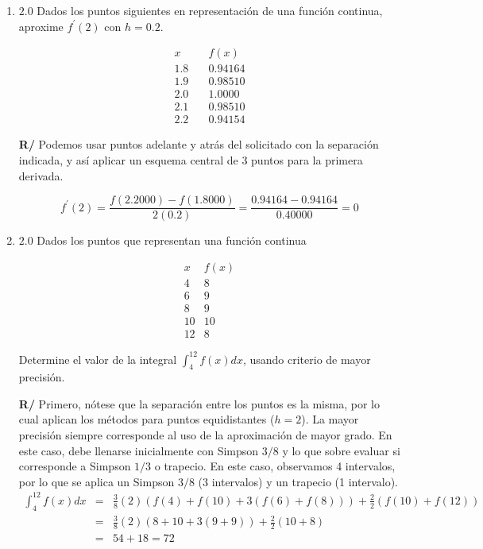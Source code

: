 \documentclass[12pt]{article}
\begin{document}
\vspace{-.5cm}
  \begin{enumerate}[leftmargin=*,widest=9]
  
     \item \(2.0\) Dados los puntos siguientes en representación de una función continua, aproxime \(f^\prime(2)\) con \(h=0.2\).
     
     \[
     \begin{array}{lr}
     x  & f(x)\\
     1.8 \quad & 0.94164\\
     1.9 & 0.98510\\
     2.0 & 1.0000\\
     2.1 & 0.98510\\
     2.2 & 0.94154
     \end{array}
     \]
     
         \textbf{R/} Podemos usar puntos adelante y atrás del solicitado con la separación indicada, y así aplicar un esquema central de 3 puntos para la primera derivada.
    
    \[
    f^\prime(2) = \frac{f(2.2000) - f(1.8000)}{2(0.2)} = \frac{0.94164 - 0.94164}{0.40000} = 0
    \]
     
    \item \(2.0\) Dados los puntos que representan una función continua
    
    \[
    \begin{array}{lr}
    x & f(x)\\
    4 & 8\\
    6 & 9\\
    8 & 9\\
    10 & 10\\
    12 & 8    
    \end{array}
    \]
    
    Determine el valor de la integral \( \int^{12}_4 f(x)dx\), usando criterio de mayor precisión.
    
\textbf{R/} Primero, nótese que la separación entre los puntos es la misma, por lo cual aplican los métodos para puntos equidistantes (\(h=2\)). La mayor precisión siempre corresponde al uso de la aproximación de mayor grado. En este caso, debe llenarse inicialmente con Simpson \(3/8\) y lo que sobre evaluar si corresponde a Simpson \(1/3\) o trapecio. En este caso, observamos 4 intervalos, por lo que se aplica un Simpson \(3/8\) (3 intervalos) y un trapecio (1 intervalo).
\begin{eqnarray*}
\int^{12}_4 f(x)dx  &=& \frac{3}{8}(2)\left(f(4) + f(10) + 3 (f(6) + f(8)) \right) + \frac{2}{2} \left(f(10) + f(12) \right) \\
&=&\frac{3}{8}(2)\left(8 + 10 + 3 (9 + 9) \right) + \frac{2}{2} \left(10 + 8 \right) \\
&=&54 + 18 = 72
\end{eqnarray*}
        

\end{enumerate}
\end{document}
